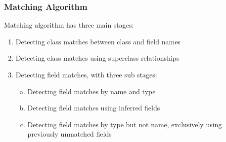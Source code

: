 \documentclass{beamer}
\begin{document}
\begin{frame}
  \frametitle{Matching Algorithm}
  Matching algorithm has three main stages:
  \begin{enumerate}[1)]
    \item Detecting class matches between class and field names
    \item Detecting class matches using superclass relationships
    \item Detecting field matches, with three sub stages:
    \begin{enumerate}[a)]
      \item Detecting field matches by name and type
      \item Detecting field matches using inferred fields
      \item Detecting field matches by type but not name, exclusively using previously unmatched fields
    \end{enumerate}
  \end{enumerate}
\end{frame}
\end{document}
